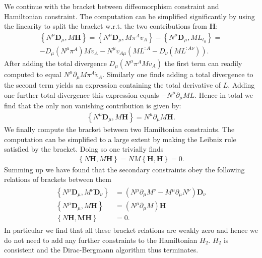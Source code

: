 \documentclass[a4paper,12pt, DIV=14, BCOR=5mm, twoside, headsepline, numbers=noenddot]{scrbook}
\begin{document}
We continue with the bracket between diffeomorphism constraint and Hamiltonian constraint. The computation can be simplified significantly by using the linearity to split the bracket w.r.t. the two contributions from $\mathbf{H}$: 
\begin{multline}
    \left \{ N^{\mu}\mathbf{D}_{\mu}, M \mathbf{H} \right \} = \left \{ N^\mu \mathbf{D}_\mu , M \pi^A \dot{v}_A   \right \} - \left \{ N^\mu \mathbf{D}_\mu , M L_{t_0}  \right \} = \\
    - D_\mu (N^\mu \pi^A) M \dot{v}_A - N^\mu v_{A\mu} (M L^{:A} - D_\nu (M L^{:A \nu}))  .
\end{multline}
After adding the total divergence $D_{\mu}(N^\mu \pi^A M \dot{v}_A)$ the first term can readily computed to equal $N^\mu \partial_\mu M \pi^A \dot{v}_A$. Similarly one finds adding a total divergence to the second term yields an expression containing the total derivative of $L$. Adding one further total divergence this expression equals $-N^\mu \partial _\mu M L$. Hence in total we find that the only non vanishing contribution is given by:
\begin{align}
    \left \{ N^{\mu}\mathbf{D}_{\mu}, M \mathbf{H} \right \} = N^\mu \partial_\mu M \mathbf{H}.
\end{align}
We finally compute the bracket between two Hamiltonian constraints. The computation can be simplified to a large extent by making the Leibniz rule satisfied by the bracket. Doing so one trivially finds 
\begin{align}
    \left \{N \mathbf{H}, M \mathbf{H} \right \} = N M \left \{ \mathbf{H}, \mathbf{H}\right \} = 0.
\end{align}
Summing up we have found that the secondary constraints obey the following relations of brackets between them
\begin{align}
    \begin{aligned}
    \left \{N^\mu \mathbf{D}_\mu, M^\nu \mathbf{D}_\nu \right \} &= (N^\mu \partial_\mu M^\nu - M^\mu \partial _\mu N^\nu)\mathbf{D}_{\nu}\\
    \left \{ N^\mu \mathbf{D}_\mu , M \mathbf{H}\right \} &= (N^\mu \partial_\mu M) \mathbf{H}\\
    \left \{N \mathbf{H , M \mathbf{H}} \right \} &= 0.
    \end{aligned}
\end{align}
In particular we find that all these bracket relations are weakly zero and hence we do not need to add any further constraints to the Hamiltonian $H_2$. $H_2$ is consistent and the Dirac-Bergmann algorithm thus terminates. 
\end{document}
